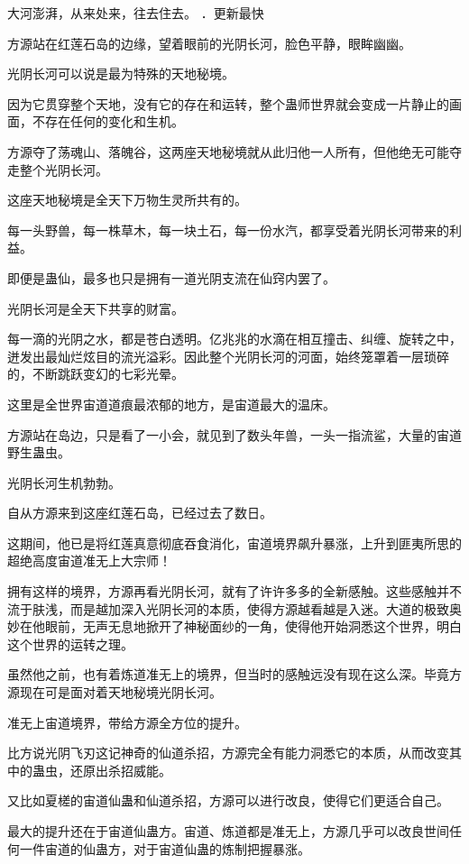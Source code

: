 
\begin{this_body}

大河澎湃，从来处来，往去住去。 ．更新最快

方源站在红莲石岛的边缘，望着眼前的光阴长河，脸色平静，眼眸幽幽。

光阴长河可以说是最为特殊的天地秘境。

因为它贯穿整个天地，没有它的存在和运转，整个蛊师世界就会变成一片静止的画面，不存在任何的变化和生机。

方源夺了荡魂山、落魄谷，这两座天地秘境就从此归他一人所有，但他绝无可能夺走整个光阴长河。

这座天地秘境是全天下万物生灵所共有的。

每一头野兽，每一株草木，每一块土石，每一份水汽，都享受着光阴长河带来的利益。

即便是蛊仙，最多也只是拥有一道光阴支流在仙窍内罢了。

光阴长河是全天下共享的财富。

每一滴的光阴之水，都是苍白透明。亿兆兆的水滴在相互撞击、纠缠、旋转之中，迸发出最灿烂炫目的流光溢彩。因此整个光阴长河的河面，始终笼罩着一层琐碎的，不断跳跃变幻的七彩光晕。

这里是全世界宙道道痕最浓郁的地方，是宙道最大的温床。

方源站在岛边，只是看了一小会，就见到了数头年兽，一头一指流鲨，大量的宙道野生蛊虫。

光阴长河生机勃勃。

自从方源来到这座红莲石岛，已经过去了数日。

这期间，他已是将红莲真意彻底吞食消化，宙道境界飙升暴涨，上升到匪夷所思的超绝高度宙道准无上大宗师！

拥有这样的境界，方源再看光阴长河，就有了许许多多的全新感触。这些感触并不流于肤浅，而是越加深入光阴长河的本质，使得方源越看越是入迷。大道的极致奥妙在他眼前，无声无息地掀开了神秘面纱的一角，使得他开始洞悉这个世界，明白这个世界的运转之理。

虽然他之前，也有着炼道准无上的境界，但当时的感触远没有现在这么深。毕竟方源现在可是面对着天地秘境光阴长河。

准无上宙道境界，带给方源全方位的提升。

比方说光阴飞刃这记神奇的仙道杀招，方源完全有能力洞悉它的本质，从而改变其中的蛊虫，还原出杀招威能。

又比如夏槎的宙道仙蛊和仙道杀招，方源可以进行改良，使得它们更适合自己。

最大的提升还在于宙道仙蛊方。宙道、炼道都是准无上，方源几乎可以改良世间任何一件宙道的仙蛊方，对于宙道仙蛊的炼制把握暴涨。


\end{this_body}

